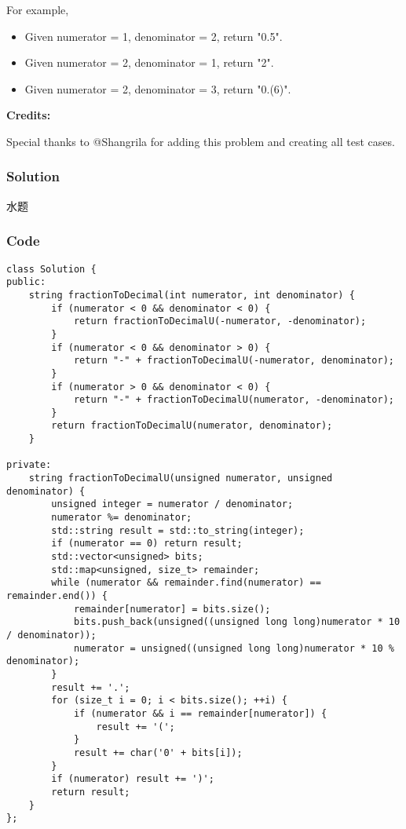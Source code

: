 \documentclass[courier]{article}
\begin{document}
\begin{CJK*}{UTF8}{gkai}
For example,

\begin{itemize}
\item Given numerator = 1, denominator = 2, return "0.5".
\item Given numerator = 2, denominator = 1, return "2".
\item Given numerator = 2, denominator = 3, return "0.(6)".
\end{itemize}

\textbf{Credits:}

Special thanks to @Shangrila for adding this problem and creating all test cases.



\subsubsection*{Solution}
水题

\subsubsection*{Code}
\begin{lstlisting}
class Solution {
public:
    string fractionToDecimal(int numerator, int denominator) {
        if (numerator < 0 && denominator < 0) {
            return fractionToDecimalU(-numerator, -denominator);
        }
        if (numerator < 0 && denominator > 0) {
            return "-" + fractionToDecimalU(-numerator, denominator);
        }
        if (numerator > 0 && denominator < 0) {
            return "-" + fractionToDecimalU(numerator, -denominator);
        }
        return fractionToDecimalU(numerator, denominator);
    }
    
private:
    string fractionToDecimalU(unsigned numerator, unsigned denominator) {
        unsigned integer = numerator / denominator;
        numerator %= denominator;
        std::string result = std::to_string(integer);
        if (numerator == 0) return result;
        std::vector<unsigned> bits;
        std::map<unsigned, size_t> remainder;
        while (numerator && remainder.find(numerator) == remainder.end()) {
            remainder[numerator] = bits.size();
            bits.push_back(unsigned((unsigned long long)numerator * 10 / denominator));
            numerator = unsigned((unsigned long long)numerator * 10 % denominator);
        }
        result += '.';
        for (size_t i = 0; i < bits.size(); ++i) {
            if (numerator && i == remainder[numerator]) {
                result += '(';
            }
            result += char('0' + bits[i]);
        }
        if (numerator) result += ')';
        return result;
    }
}; 
\end{lstlisting}



\end{CJK*}
\end{document}
